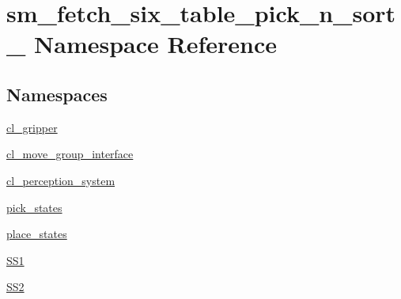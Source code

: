 \hypertarget{namespacesm__fetch__six__table__pick__n__sort__1}{}\section{sm\+\_\+fetch\+\_\+six\+\_\+table\+\_\+pick\+\_\+n\+\_\+sort\+\_ Namespace Reference}
\label{namespacesm__fetch__six__table__pick__n__sort__1}
\subsection*{Namespaces}
\begin{DoxyCompactItemize}
\item 
 \hyperlink{namespacesm__fetch__six__table__pick__n__sort__1_1_1cl__gripper}{cl\+\_\+gripper}
\item 
 \hyperlink{namespacesm__fetch__six__table__pick__n__sort__1_1_1cl__move__group__interface}{cl\+\_\+move\+\_\+group\+\_\+interface}
\item 
 \hyperlink{namespacesm__fetch__six__table__pick__n__sort__1_1_1cl__perception__system}{cl\+\_\+perception\+\_\+system}
\item 
 \hyperlink{namespacesm__fetch__six__table__pick__n__sort__1_1_1pick__states}{pick\+\_\+states}
\item 
 \hyperlink{namespacesm__fetch__six__table__pick__n__sort__1_1_1place__states}{place\+\_\+states}
\item 
 \hyperlink{namespacesm__fetch__six__table__pick__n__sort__1_1_1SS1}{S\+S1}
\item 
 \hyperlink{namespacesm__fetch__six__table__pick__n__sort__1_1_1SS2}{S\+S2}
\end{DoxyCompactItemize}
